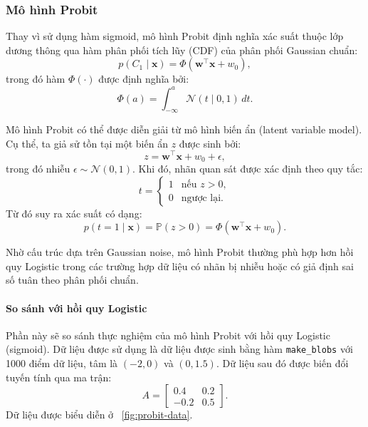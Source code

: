 \subsubsection{Mô hình Probit}

Thay vì sử dụng hàm sigmoid, mô hình Probit định nghĩa xác suất thuộc lớp dương
thông qua hàm phân phối tích lũy (CDF) của phân phối Gaussian chuẩn:
\begin{equation}
  p(C_1 \mid \boldsymbol{x}) = \Phi(\boldsymbol{w}^{\intercal}\boldsymbol{x} +
  w_0),
\end{equation} trong đó hàm \(\Phi(\cdot)\) được định nghĩa bởi:
\begin{equation}
  \Phi(a) = \int_{-\infty}^{a} \mathcal{N}(t \mid 0,1)\, dt.
\end{equation}

Mô hình Probit có thể được diễn giải từ mô hình biến ẩn (latent variable
model). Cụ thể, ta giả sử tồn tại một biến ẩn \(z\) được sinh bởi:
\begin{equation}
  z = \boldsymbol{w}^{\intercal}\boldsymbol{x} + w_0 + \epsilon,
\end{equation} trong đó nhiễu \(\epsilon \sim \mathcal{N}(0,1)\). Khi đó, nhãn
quan sát được xác định theo quy tắc: \begin{equation}
  t = \begin{cases}
    1 & \text{nếu $z > 0$}, \\
    0 & \text{ngược lại}.
  \end{cases}
\end{equation} Từ đó suy ra xác suất có dạng: \begin{equation}
  p(t = 1 \mid \boldsymbol{x}) = \mathbb{P}(z > 0)
  = \Phi(\boldsymbol{w}^{\intercal}\boldsymbol{x} + w_0).
\end{equation}

Nhờ cấu trúc dựa trên Gaussian noise, mô hình Probit thường phù hợp hơn hồi quy
Logistic trong các trường hợp dữ liệu có nhãn bị nhiễu hoặc có giả định sai số
tuân theo phân phối chuẩn.

\paragraph{So sánh với hồi quy Logistic}

Phần này sẽ so sánh thực nghiệm của mô hình Probit với hồi quy Logistic
(sigmoid). Dữ liệu được sử dụng là dữ liệu được sinh bằng hàm
\texttt{make\_blobs} với 1000 điểm dữ liệu, tâm là $(-2, 0)$ và $(0, 1.5)$. Dữ
liệu sau đó được biến đổi tuyến tính qua ma trận: \begin{equation}
  A = \begin{bmatrix}
    0.4 & 0.2\\
    -0.2 & 0.5
  \end{bmatrix}.
\end{equation} Dữ liệu được biểu diễn ở \figurename~\ref{fig:probit-data}.

